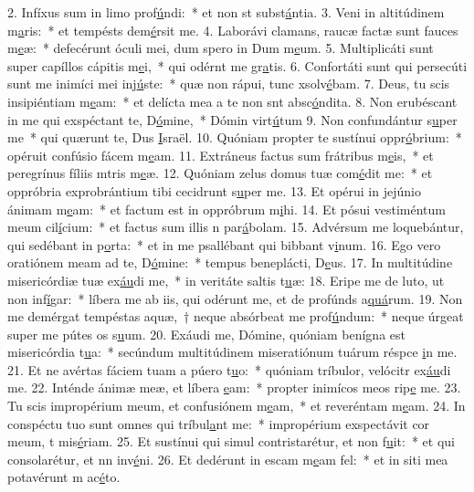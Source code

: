 2. Infíxus sum in limo prof\uline{ú}ndi:~* et non st subst\uline{á}ntia.
3. Veni in altitúdinem m\uline{a}ris:~* et tempésts dem\uline{é}rsit me.
4. Laborávi clamans, raucæ factæ sunt fauces m\uline{e}æ:~* defecérunt óculi mei, dum spero in Dum m\uline{e}um.
5. Multiplicáti sunt super capíllos cápitis m\uline{e}i,~* qui odérnt me gr\uline{a}tis.
6. Confortáti sunt qui persecúti sunt me inimíci mei inj\uline{ú}ste:~* quæ non rápui, tunc xsolv\uline{é}bam.
7. Deus, tu scis insipiéntiam m\uline{e}am:~* et delícta mea a te non snt absc\uline{ó}ndita.
8. Non erubéscant in me qui exspéctant te, D\uline{ó}mine,~* Dómin virt\uline{ú}tum
9. Non confundántur s\uline{u}per me~* qui quærunt te, Dus \uline{I}sraël.
10. Quóniam propter te sustínui oppr\uline{ó}brium:~* opéruit confúsio fácem m\uline{e}am.
11. Extráneus factus sum frátribus m\uline{e}is,~* et peregrínus fíliis mtris m\uline{e}æ.
12. Quóniam zelus domus tuæ com\uline{é}dit me:~* et oppróbria exprobrántium tibi cecidrunt s\uline{u}per me.
13. Et opérui in jejúnio ánimam m\uline{e}am:~* et factum est in oppróbrum m\uline{i}hi.
14. Et pósui vestiméntum meum cil\uline{í}cium:~* et factus sum illis n par\uline{á}bolam.
15. Advérsum me loquebántur, qui sedébant in p\uline{o}rta:~* et in me psallébant qui bibbant v\uline{i}num.
16. Ego vero oratiónem meam ad te, D\uline{ó}mine:~* tempus beneplácti, D\uline{e}us.
17. In multitúdine misericórdiæ tuæ ex\uline{áu}di me,~* in veritáte saltis t\uline{u}æ:
18. Eripe me de luto, ut non inf\uline{í}gar:~* líbera me ab iis, qui odérunt me, et de profúnds a\uline{quá}rum.
19. Non me demérgat tempéstas aquæ,~† neque absórbeat me prof\uline{ú}ndum:~* neque úrgeat super me pútes os s\uline{u}um.
20. Exáudi me, Dómine, quóniam benígna est misericórdia t\uline{u}a:~* secúndum multitúdinem miseratiónum tuárum réspce \uline{i}n me.
21. Et ne avértas fáciem tuam a púero t\uline{u}o:~* quóniam tríbulor, velócitr ex\uline{áu}di me.
22. Inténde ánimæ meæ, et líbera \uline{e}am:~* propter inimícos meos rip\uline{e} me.
23. Tu scis impropérium meum, et confusiónem m\uline{e}am,~* et reveréntam m\uline{e}am.
24. In conspéctu tuo sunt omnes qui tríbul\uline{a}nt me:~* impropérium exspectávit cor meum, t mis\uline{é}riam.
25. Et sustínui qui simul contristarétur, et non f\uline{u}it:~* et qui consolarétur, et nn inv\uline{é}ni.
26. Et dedérunt in escam m\uline{e}am fel:~* et in siti mea potavérunt m ac\uline{é}to.
